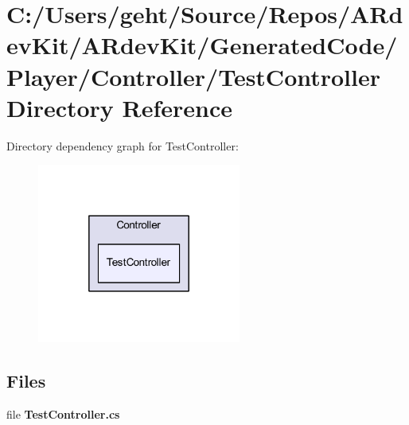 \section{C\-:/\-Users/geht/\-Source/\-Repos/\-A\-Rdev\-Kit/\-A\-Rdev\-Kit/\-Generated\-Code/\-Player/\-Controller/\-Test\-Controller Directory Reference}
\label{dir_5f98fbb4db7ec840fe4ebdaf4e5d38fe}
Directory dependency graph for Test\-Controller\-:
\nopagebreak
\begin{figure}[H]
\begin{center}
\leavevmode
\includegraphics[width=190pt]{dir_5f98fbb4db7ec840fe4ebdaf4e5d38fe_dep}
\end{center}
\end{figure}
\subsection*{Files}
\begin{DoxyCompactItemize}
\item 
file {\bfseries Test\-Controller.\-cs}
\end{DoxyCompactItemize}

